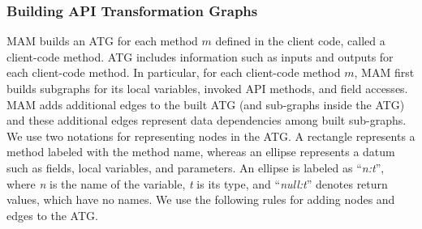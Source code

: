\subsubsection{Building API Transformation Graphs}

MAM builds an ATG for each method $m$ defined in the client code, called a client-code method.
ATG includes information such as inputs
and outputs for each client-code method. In particular, for
each client-code method $m$, MAM first builds subgraphs for its local variables,
invoked API methods, and field accesses. MAM adds additional edges
to the built ATG (and sub-graphs inside the ATG) and these additional edges
represent data dependencies among built sub-graphs.
We use two notations for representing nodes in the ATG. A rectangle
represents a method labeled with the method name, whereas an ellipse
represents a datum such as fields, local variables, and parameters.
An ellipse is labeled as ``\emph{n:t}'', where \emph{n} is the name
of the variable, \emph{t} is its type, and ``\emph{null:t}'' denotes return values, which have no names. We use the
following rules for adding nodes and edges to the ATG.



%

